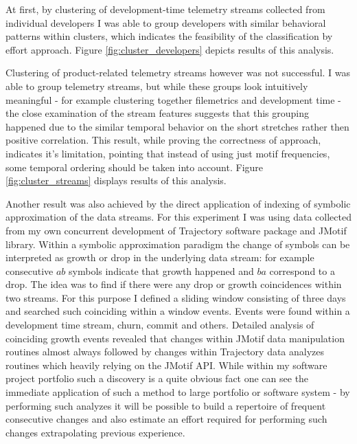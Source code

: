 \documentclass{sig-alternate}
\begin{document}
At first, by clustering of development-time telemetry streams collected from individual developers I was able to group developers with similar behavioral patterns within clusters, which indicates the feasibility of the classification by effort approach. Figure \ref{fig:cluster_developers} depicts results of this analysis.

Clustering of product-related telemetry streams however was not successful. I was able to group telemetry streams, but while these groups look intuitively meaningful - for example clustering together filemetrics and development time - the close examination of the stream features suggests that this grouping happened due to the similar temporal behavior on the short stretches rather then positive correlation. This result, while proving the correctness of approach, indicates it's limitation, pointing that instead of using just motif frequencies, some temporal ordering should be taken into account. Figure \ref{fig:cluster_streams} displays results of this analysis.

Another result was also achieved by the direct application of indexing of symbolic approximation of the data streams. For this experiment I was using data collected from my own concurrent development of Trajectory software package and JMotif library. Within a symbolic approximation paradigm the change of symbols can be interpreted as growth or drop in the underlying data stream: for example consecutive $ab$ symbols indicate that growth happened and $ba$ correspond to a drop. The idea was to find if there were any drop or growth coincidences within two streams. For this purpose I defined a sliding window consisting of three days and searched such coinciding within a window events. Events were found within a development time stream, churn, commit and others. Detailed analysis of coinciding growth events revealed that changes within JMotif data manipulation routines almost always followed by changes within Trajectory data analyzes routines which heavily relying on the JMotif API. While within my software project portfolio such a discovery is a quite obvious fact one can see the immediate application of such a method to large portfolio or software system - by performing such analyzes it will be possible to build a repertoire of frequent consecutive changes and also estimate an effort required for performing such changes extrapolating previous experience.
\end{document}
